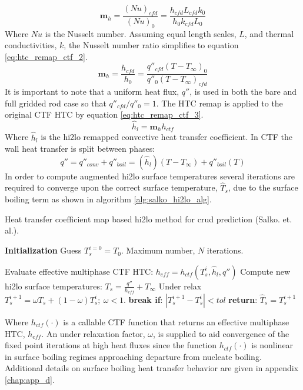     \begin{equation}
        \mathbf m_h = \frac{(Nu)_{cfd}}{(Nu)_{0}} = \frac{h_{cfd} L_{cfd} k_{0} }{h_{0}k_{cfd} L_{0}}
         \label{eq:htc_remap_ctf_1}
    \end{equation}
    Where $Nu$ is the Nusselt number.  Assuming equal length scales, $L$, and thermal conductivities, $k$, the Nusselt number ratio simplifies to equation \ref{eq:htc_remap_ctf_2}.
    \begin{equation}
        \mathbf m_h = \frac{h_{cfd}}{h_{0}} = \frac{q''_{cfd}(T-T_\infty)_{0}}{q''_{0}(T-T_\infty)_{cfd}}
        \label{eq:htc_remap_ctf_2}
    \end{equation}
    It is important to note that a uniform heat flux, $q''$, is used in both the bare and full gridded rod case so that $q''_{cfd}/q''_0 =1 $.
    The HTC remap is applied to the original CTF HTC by equation \ref{eq:htc_remap_ctf_3}.
    \begin{equation}
        \hat h_{l} = \mathbf m_h h_{ctf}
        \label{eq:htc_remap_ctf_3}
    \end{equation}
    Where $\hat h_l$ is the hi2lo remapped convective heat transfer coefficient.  In CTF the wall heat transfer is split between phases:
    \begin{equation}
        q'' = q''_{conv} + q''_{boil} = (\hat h_l)(T-T_{\infty}) + q''_{boil}(T)
    \end{equation}
    In order to compute augmented hi2lo surface temperatures
    several iterations are required to converge upon the correct surface temperature, $\hat T_s$, due to the surface boiling term as shown in algorithm \ref{alg:salko_hi2lo_alg}.  

    \begin{algorithm}[H]
        \caption{Heat transfer coefficient map based hi2lo method for crud prediction (Salko. et. al.).}
    \begin{algorithmic}[1]
    \STATE \textbf{Initialization} 
    \STATE Guess $T^{i=0}_s=T_0$.  Maximum number, $N$ iterations.

           \STATE Evaluate effective multiphase CTF HTC: $h_{eff} = h_{{ctf}}(T^i_{s}, \hat h_l, q'')$ \;
           \STATE Compute new hi2lo surface temperatures: $T_{s} = \frac{q''}{h_{eff}} + T_\infty$ \;
           \STATE  Under relax  $T^{i+1}_{s} = \omega T_{s} + (1 - \omega) T^{i}_{s} ;\ \omega < 1.$ \;
           \STATE  \textbf{break if}:  $|T^{i+1}_s - T^i_s| < tol$ \;
        \ENDFOR 
    \STATE \textbf{return}: $\hat T_s = T^{i+1}_s$
    \end{algorithmic}
    \label{alg:salko_hi2lo_alg}
    \end{algorithm}
    Where $h_{ctf}(\cdot)$ is a callable CTF function that returns an effective multiphase HTC, $h_{eff}$.  An under relaxation factor, $\omega$, is supplied to aid convergence of the fixed point iterations at high heat fluxes since the function $h_{ctf}(\cdot)$ is nonlinear in surface boiling regimes approaching departure from nucleate boiling.  Additional details on surface boiling heat transfer behavior are given in appendix \ref{chap:app_d}.

